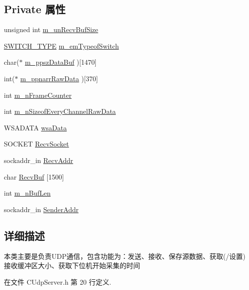 \subsection*{Private 属性}
\begin{DoxyCompactItemize}
\item 
unsigned int \hyperlink{class_c_udp_server_ad1366d54462c24ed2f0156311d71a378}{m\+\_\+un\+Recv\+Buf\+Size}
\item 
\hyperlink{_c_udp_server_8h_a41273fdeb63230b3a5c360d8c7c11b82}{S\+W\+I\+T\+C\+H\+\_\+\+T\+Y\+PE} \hyperlink{class_c_udp_server_a3474dde8431418b65afdd6dd13f20e4b}{m\+\_\+em\+Typeof\+Switch}
\item 
char($\ast$ \hyperlink{class_c_udp_server_a57438bdfb49bff7554c247c509eb261b}{m\+\_\+ppsz\+Data\+Buf} )\mbox{[}1470\mbox{]}
\item 
int($\ast$ \hyperlink{class_c_udp_server_a4203d95ecbe66da8c6965c49692fd8b0}{m\+\_\+ppnarr\+Raw\+Data} )\mbox{[}370\mbox{]}
\item 
int \hyperlink{class_c_udp_server_ac984961f2a410078bd0b2bd9f3fc86e2}{m\+\_\+n\+Frame\+Counter}
\item 
int \hyperlink{class_c_udp_server_abab4eee91459d8fe9adaf442a2cc0d0e}{m\+\_\+n\+Sizeof\+Every\+Channel\+Raw\+Data}
\item 
W\+S\+A\+D\+A\+TA \hyperlink{class_c_udp_server_a99d916e8fd71179b86cd135c2a27a905}{wsa\+Data}
\item 
S\+O\+C\+K\+ET \hyperlink{class_c_udp_server_a8161985c5b83878068a0e6ce4c8bcfd7}{Recv\+Socket}
\item 
sockaddr\+\_\+in \hyperlink{class_c_udp_server_a72b80c70fe65c0d70d3af3c2f9c38a3d}{Recv\+Addr}
\item 
char \hyperlink{class_c_udp_server_aa36e5573cde44b5eb5a5705b746c388f}{Recv\+Buf} \mbox{[}1500\mbox{]}
\item 
int \hyperlink{class_c_udp_server_af05b43787c7193d9ba50e9fa87f44675}{m\+\_\+n\+Buf\+Len}
\item 
sockaddr\+\_\+in \hyperlink{class_c_udp_server_afa4f2f8a24a79e3423d13b07a005f387}{Sender\+Addr}
\end{DoxyCompactItemize}


\subsection{详细描述}
本类主要是负责\+U\+D\+P通信，包含功能为：发送、接收、保存源数据、获取(/设置)接收缓冲区大小、获取下位机开始采集的时间 

在文件 C\+Udp\+Server.\+h 第 20 行定义.



